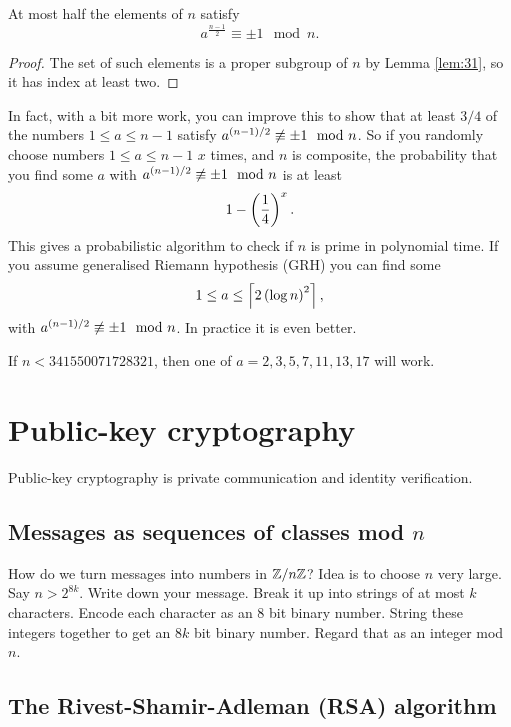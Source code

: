 \begin{corollary}
At most half the elements of $ \unit{n} $ satisfy
$$ a^{\tfrac{n - 1}{2}} \equiv \pm 1 \mod n. $$
\end{corollary}

\begin{proof}
The set of such elements is a proper subgroup of $ \unit{n} $ by Lemma \ref{lem:31}, so it has index at least two.
\end{proof}

In fact, with a bit more work, you can improve this to show that at least $ 3 / 4 $ of the numbers $ 1 \le a \le n - 1 $ satisfy $ a^{\left( n - 1 \right) / 2} \not\equiv \pm 1 \mod n $. So if you randomly choose numbers $ 1 \le a \le n - 1 $ $ x $ times, and $ n $ is composite, the probability that you find some $ a $ with $ a^{\left( n - 1 \right) / 2} \not\equiv \pm 1 \mod n $ is at least
$$ 1 - \left( \dfrac{1}{4} \right)^x. $$
This gives a probabilistic algorithm to check if $ n $ is prime in polynomial time. If you assume generalised Riemann hypothesis (GRH) you can find some
$$ 1 \le a \le \left\lceil 2 \left( \log n \right)^2 \right\rceil, $$
with $ a^{\left( n - 1 \right) / 2} \not\equiv \pm 1 \mod n $. In practice it is even better.

\begin{example*}
If $ n < 341550071728321 $, then one of $ a = 2, 3, 5, 7, 11, 13, 17 $ will work.
\end{example*}

\pagebreak

\section{Public-key cryptography}

Public-key cryptography is private communication and identity verification.

\subsection{Messages as sequences of classes mod $ n $}

How do we turn messages into numbers in $ \mathbb{Z} / n\mathbb{Z} $? Idea is to choose $ n $ very large. Say $ n > 2^{8k} $. Write down your message. Break it up into strings of at most $ k $ characters. Encode each character as an $ 8 $ bit binary number. String these integers together to get an $ 8k $ bit binary number. Regard that as an integer mod $ n $.

\subsection{The Rivest-Shamir-Adleman (RSA) algorithm}

